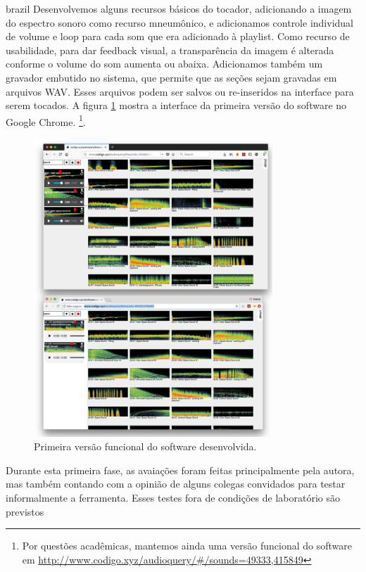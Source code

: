 \begin{otherlanguage*}{brazil}
 Desenvolvemos alguns recursos básicos do tocador, adicionando a imagem do espectro sonoro como recurso mneumônico, e adicionamos controle individual de volume e loop para cada som que era adicionado à playlist. Como recurso de usabilidade, para dar feedback visual, a transparência da imagem é alterada conforme o volume do som aumenta ou abaixa. Adicionamos também um gravador embutido no sistema, que permite que as seções sejam gravadas em arquivos WAV. Esses arquivos podem ser salvos ou re-inseridos na interface para serem tocados. A figura \ref{fig:audioquery} mostra a interface da primeira versão do software no Google Chrome. \footnote{Por questões acadêmicas, mantemos ainda uma versão funcional do software em \url{http://www.codigo.xyz/audioquery/#/sounds=49333,415849}}.

\begin{figure}
\centering
\includegraphics[width=0.8\textwidth]{pictures/cap4/audioquery_browsers}
\caption{\label{audiquery}Primeira versão funcional do software desenvolvida.}
\label{fig:audioquery}
\end{figure}

Durante esta primeira fase, as avaiações foram feitas principalmente pela autora, mas também contando com a opinião de alguns colegas convidados para testar informalmente a ferramenta. Esses testes fora de condições de laboratório são previstos  


\end{otherlanguage*}
